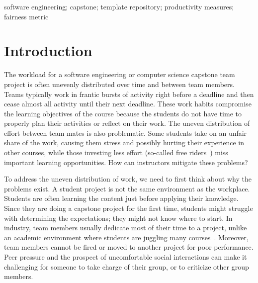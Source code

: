 \documentclass[10pt, conference]{IEEEtran}
\begin{document}
\begin{IEEEkeywords}
software engineering; capstone; template repository; productivity measures;
fairness metric
\end{IEEEkeywords}

\section{Introduction} \label{SecIntro}

The workload for a software engineering or computer science capstone team
project is often unevenly distributed over time and between team members.  Teams
typically work in frantic bursts of activity right before a deadline and then
cease almost all activity until their next deadline.  These work habits
compromise the learning objectives of the course because the students do not
have time to properly plan their activities or reflect on their work.  The
uneven distribution of effort between team mates is also problematic.  Some
students take on an unfair share of the work, causing them stress and possibly
hurting their experience in other courses, while those investing less effort
(so-called free riders~\cite{tushevUsingGitHubLarge2020}) miss important
learning opportunities.  How can instructors mitigate these problems?

To address the uneven distribution of work, we need to first think about why the
problems exist.  A student project is not the same environment as the workplace.
Students are often learning the content just before applying their knowledge.
Since they are doing a capstone project for the first time, students might
struggle with determining the expectations; they might not know where to start.
In industry, team members usually dedicate most of their time to a project, unlike
an academic environment where students are juggling many
courses~\cite{connReusableAcademicstrengthMetricsbased2004}. Moreover, team
members cannot be fired or moved to another project for poor performance.  Peer
pressure and the prospect of uncomfortable social interactions can make it
challenging for someone to take charge of their group, or to criticize other
group members. %

\end{document}
